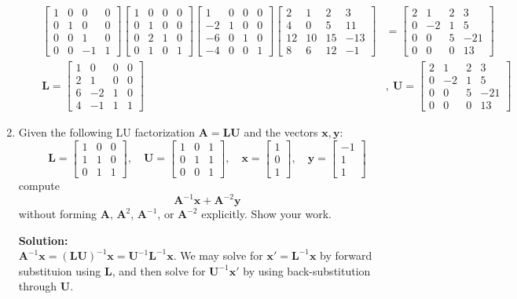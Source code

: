 \documentclass[]{article}
\newcommand{\A}{\bm{A}}					%
\newcommand{\ML}{\bm{L}}				%
\newcommand{\MU}{\bm{U}}				%
\newcommand{\bbm}{\begin{bmatrix}}		%
\newcommand{\ebm}{\end{bmatrix}}		%
\newcommand{\x}{\bm{x}}					%
\newcommand{\y}{\bm{y}}					%
\newcommand{\solution}{\vskip 0.5cm \textbf{\large Solution:} \\}
\begin{document}
\begin{enumerate}
\begin{enumerate}
\[\begin{split}
        \bbm 1&0&0&0 \\ 0&1&0&0 \\ 0&0&1&0 \\ 0&0&-1&1 \ebm \bbm 1&0&0&0 \\ 0&1&0&0 \\ 0&2&1&0 \\ 0&1&0&1 \ebm \bbm 1&0&0&0 \\ -2&1&0&0 \\ -6&0&1&0 \\ -4&0&0&1 \ebm \bbm 2&1&2&3\\4&0&5&11\\12&10&15&-13\\8&6&12&-1 \ebm &= \bbm 2&1&2&3\\0&-2&1&5\\0&0&5&-21\\0&0&0&13 \ebm \\
        \ML = \bbm 1&0&0&0 \\ 2&1&0&0 \\ 6&-2&1&0 \\ 4&-1&1&1 \ebm &,~\MU = \bbm 2&1&2&3\\0&-2&1&5\\0&0&5&-21\\0&0&0&13 \ebm
        \end{split}\]
	  \end{enumerate}

	\item Given the following LU factorization $\A=\bm{LU}$ and the vectors $\x,\y$:
	  \[
	  \bm{L}=\bbm 1&0&0\\1&1&0\\0&1&1\ebm,\quad \bm{U}=\bbm 1&0&1\\0&1&1\\0&0&1\ebm,\quad \x=\bbm 1\\0\\1\ebm, \quad \y=\bbm -1\\1\\1\ebm
	  \]
	  compute
	  \[
	  \A^{-1}\x + \A^{-2}\y
	  \]
	  without forming $\A$, $\A^2$, $\A^{-1}$, or $\A^{-2}$ explicitly. Show your work.

	  \solution

      $\A^{-1}\x = (\bm{LU})^{-1}\x = \bm{U}^{-1}\bm{L}^{-1}\x$. We
      may solve for $\x' = \bm{L}^{-1}\x$ by forward substituion using
      $\bm{L}$, and then solve for $\bm{U}^{-1}\x'$ by using
      back-substitution through $\bm{U}$.


\end{enumerate}
\end{document}
